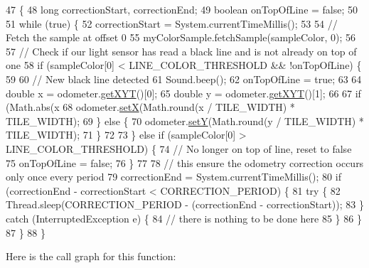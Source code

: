 \begin{DoxyCode}
47                     \{
48     \textcolor{keywordtype}{long} correctionStart, correctionEnd;
49     \textcolor{keywordtype}{boolean} onTopOfLine = \textcolor{keyword}{false};
50 
51     \textcolor{keywordflow}{while} (\textcolor{keyword}{true}) \{
52       correctionStart = System.currentTimeMillis();
53 
54       \textcolor{comment}{// Fetch the sample at offset 0}
55       myColorSample.fetchSample(sampleColor, 0);
56 
57       \textcolor{comment}{// Check if our light sensor has read a black line and is not already on top of one}
58       \textcolor{keywordflow}{if} (sampleColor[0] < LINE\_COLOR\_THRESHOLD && !onTopOfLine) \{
59 
60         \textcolor{comment}{// New black line detected}
61         Sound.beep();
62         onTopOfLine = \textcolor{keyword}{true};
63 
64         \textcolor{keywordtype}{double} x = odometer.\hyperlink{classca_1_1mcgill_1_1ecse211_1_1odometer_1_1_odometer_data_a8f40f0264c68f0cbed4fff1723ae7863}{getXYT}()[0];
65         \textcolor{keywordtype}{double} y = odometer.\hyperlink{classca_1_1mcgill_1_1ecse211_1_1odometer_1_1_odometer_data_a8f40f0264c68f0cbed4fff1723ae7863}{getXYT}()[1];
66 
67         \textcolor{keywordflow}{if} (Math.abs(x %
68           odometer.\hyperlink{classca_1_1mcgill_1_1ecse211_1_1odometer_1_1_odometer_data_a2911d7215e47f3064defe016b46bfeef}{setX}(Math.round(x / TILE\_WIDTH) * TILE\_WIDTH);
69         \} \textcolor{keywordflow}{else} \{
70           odometer.\hyperlink{classca_1_1mcgill_1_1ecse211_1_1odometer_1_1_odometer_data_a82986438cd462e66520bc62bb4bd2b75}{setY}(Math.round(y / TILE\_WIDTH) * TILE\_WIDTH);
71         \}
72 
73       \} \textcolor{keywordflow}{else} \textcolor{keywordflow}{if} (sampleColor[0] > LINE\_COLOR\_THRESHOLD) \{
74         \textcolor{comment}{// No longer on top of line, reset to false}
75         onTopOfLine = \textcolor{keyword}{false};
76       \}
77 
78       \textcolor{comment}{// this ensure the odometry correction occurs only once every period}
79       correctionEnd = System.currentTimeMillis();
80       \textcolor{keywordflow}{if} (correctionEnd - correctionStart < CORRECTION\_PERIOD) \{
81         \textcolor{keywordflow}{try} \{
82           Thread.sleep(CORRECTION\_PERIOD - (correctionEnd - correctionStart));
83         \} \textcolor{keywordflow}{catch} (InterruptedException e) \{
84           \textcolor{comment}{// there is nothing to be done here}
85         \}
86       \}
87     \}
88   \}
\end{DoxyCode}
Here is the call graph for this function\+:\nopagebreak

